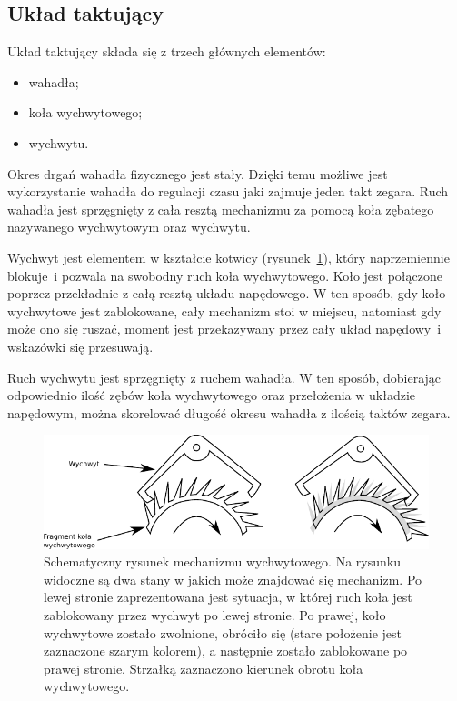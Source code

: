     	
        \subsection{Układ taktujący}
            Układ taktujący składa się z trzech głównych elementów:
            \begin{itemize}
                \item wahadła;
                \item koła wychwytowego;
                \item wychwytu.
            \end{itemize}
            Okres drgań wahadła fizycznego jest stały. Dzięki temu możliwe jest wykorzystanie wahadła do regulacji czasu jaki zajmuje jeden takt zegara.
            Ruch wahadła jest sprzęgnięty z cała resztą mechanizmu za pomocą koła zębatego nazywanego wychwytowym oraz wychwytu.
            
            Wychwyt jest elementem w kształcie kotwicy (rysunek~\ref{fig::wychwyt}), który naprzemiennie blokuje~i pozwala na swobodny ruch koła wychwytowego.
            Koło jest połączone poprzez przekładnie z całą resztą układu napędowego.
            W ten sposób, gdy koło wychwytowe jest zablokowane, cały mechanizm stoi w miejscu, natomiast gdy może ono się ruszać, moment jest przekazywany przez cały układ napędowy~i wskazówki się przesuwają.

            Ruch wychwytu jest sprzęgnięty z ruchem wahadła. W ten sposób, dobierając odpowiednio ilość zębów koła wychwytowego oraz przełożenia w układzie napędowym, można skorelować długość okresu wahadła z ilością taktów zegara.
            
            \begin{figure}[th]
            \centering
            \includegraphics[width=0.9\linewidth]{Obliczenia/wychwyt}
            \caption{Schematyczny rysunek mechanizmu wychwytowego. Na rysunku widoczne są dwa stany w jakich może znajdować się mechanizm. Po lewej stronie zaprezentowana jest sytuacja, w której ruch koła jest zablokowany przez wychwyt po lewej stronie. Po prawej, koło wychwytowe zostało zwolnione, obróciło się (stare położenie jest zaznaczone szarym kolorem), a następnie zostało zablokowane po prawej stronie. Strzałką zaznaczono kierunek obrotu koła wychwytowego.} 
            \label{fig::wychwyt}
            \end{figure}
			
